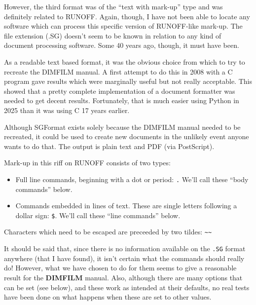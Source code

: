 \documentclass[a4paper,twoside,11pt]{article}
\newcommand{\newpara}{\par\vspace{4mm}\noindent}
\begin{document}
\newpara
However, the third format was of the ``text with mark-up'' type and was definitely related to RUNOFF.
Again, though, I have not been able to locate any software which can process this specific version
of RUNOFF-like mark-up. The file extension (.SG) doesn't seem to be known in relation to any
kind of document processing software. Some 40 years ago, though, it must have been.

\newpara
As a readable text based format, it was the obvious choice from which to try to recreate the DIMFILM
manual. A first attempt to do this in 2008 with a C program gave results which were marginally useful but not
really acceptable. This showed that a pretty complete implementation of a document formatter was needed
to get decent results. Fortunately, that is much easier using Python in 2025 than it was using C 17
years earlier.

\newpara
Although SGFormat exists solely because the DIMFILM manual needed to be recreated, it
could be used to create new documents in the unlikely event anyone wants to do that. The output is
plain text and PDF (via PostScript).

\newpara
Mark-up in this riff on RUNOFF consists of two types:
\begin{itemize}
\item Full line commands, beginning with a dot or period: \texttt{.} We'll call these ``body commands''
  below.
\item Commands embedded in lines of text. These are single letters following a dollar sign: \texttt{\$}. We'll
  call these ``line commands'' below.
\end{itemize}
Characters which need to be escaped are preceeded by two tildes: \texttt{\textasciitilde\textasciitilde}

\newpara
It should be said that, since there is no information available on the \texttt{.SG} format anywhere
(that I have found), it isn't certain what the commands should really do! However, what we
have chosen to do for them seems to give a reasonable result for the \textbf{DIMFILM} manual. Also,
although there are many options that can be set (see below), and these work as intended at their
defaults, no real tests have been done on what happens when these are set to other values.
\end{document}

